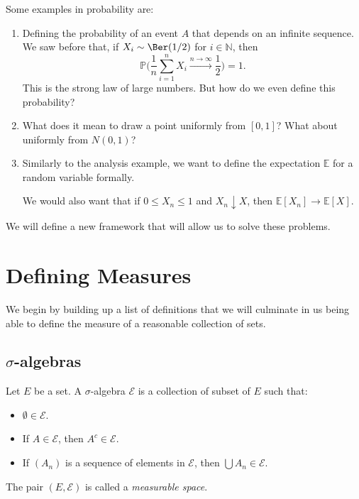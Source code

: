 \documentclass[12pt]{article}
\begin{document}
Some examples in probability are:
\begin{enumerate}
	\item Defining the probability of an event $A$ that depends on an infinite sequence. We saw before that, if $X_i \sim \Ber(1/2)$ for $i \in \mathbb{N}$, then
		\[
			\mathbb{P} \Biggl( \frac{1}{n} \sum_{i = 1}^{n} X_i \overset{n \to \infty}{\longrightarrow} \frac{1}{2} \Biggr) = 1.
		\]
		This is the strong law of large numbers. But how do we even define this probability?
	\item What does it mean to draw a point uniformly from $[0, 1]$? What about uniformly from $N(0,1)$?
	\item Similarly to the analysis example, we want to define the expectation $\mathbb{E}$ for a random variable formally.

		We would also want that if $0 \leq X_n \leq 1$ and $X_n \downarrow X$, then $\mathbb{E}[X_n] \to \mathbb{E}[X]$.
\end{enumerate}

We will define a new framework that will allow us to solve these problems.

\newpage

\section{Defining Measures}
\label{sec:defs}

We begin by building up a list of definitions that we will culminate in us being able to define the measure of a reasonable collection of sets.

\subsection{\texorpdfstring{$\sigma$-algebras}{Sigma-algebras}}
\label{sub:sigma_algs}

\begin{definition}
	Let $E$ be a set. A $\sigma$-algebra $\mathcal{E}$ is a collection of subset of $E$ such that:
	\begin{itemize}
		\item $\emptyset \in \mathcal{E}$.
		\item If $A \in \mathcal{E}$, then $A^{c} \in \mathcal{E}$.
		\item If $(A_n)$ is a sequence of elements in $\mathcal{E}$, then $\bigcup A_n \in \mathcal{E}$.
	\end{itemize}
	The pair $(E, \mathcal{E})$ is called a \emph{measurable space}.
\end{definition}
\end{document}
